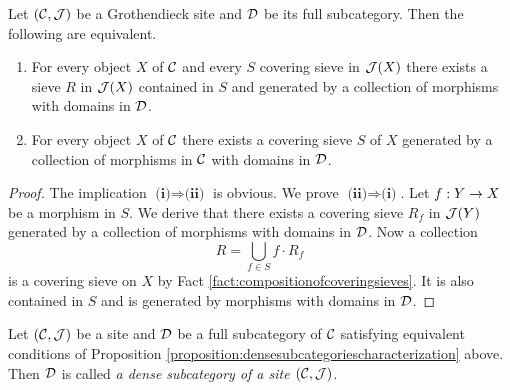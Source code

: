 \begin{proposition}\label{proposition:densesubcategoriescharacterization}
Let $({\mathcal C},{\mathcal J})$ be a Grothendieck site and ${\mathcal D}$ be its full subcategory. Then the following are equivalent.
\begin{enumerate}[label=\emph{\textbf{(\roman*)}}, leftmargin=3.0em]
\item For every object $X$ of ${\mathcal C}$ and every $S$ covering sieve in ${\mathcal J}(X)$ there exists a sieve $R$ in ${\mathcal J}(X)$ contained in $S$ and generated by a collection of morphisms with domains in ${\mathcal D}$.
\item For every object $X$ of ${\mathcal C}$ there exists a covering sieve $S$ of $X$ generated by a collection of morphisms in ${\mathcal C}$ with domains in ${\mathcal D}$.
\end{enumerate}
\end{proposition}
\begin{proof}
The implication $\textbf{(i)}\Rightarrow \textbf{(ii)}$ is obvious. We prove $\textbf{(ii)}\Rightarrow \textbf{(i)}$. Let $f:Y\rightarrow X$ be a morphism in $S$. We derive that there exists a covering sieve $R_f$ in ${\mathcal J}(Y)$ generated by a collection of morphisms with domains in ${\mathcal D}$. Now a collection
$$R = \bigcup_{f\in S}f\cdot R_f$$
is a covering sieve on $X$ by Fact \ref{fact:compositionofcoveringsieves}. It is also contained in $S$ and is generated by morphisms with domains in ${\mathcal D}$.
\end{proof}

\begin{definition}
Let $({\mathcal C}, {\mathcal J})$ be a site and ${\mathcal D}$ be a full subcategory of ${\mathcal C}$ satisfying equivalent conditions of Proposition \ref{proposition:densesubcategoriescharacterization} above. Then ${\mathcal D}$ is called \textit{a dense subcategory of a site $({\mathcal C},{\mathcal J})$}.
\end{definition}

